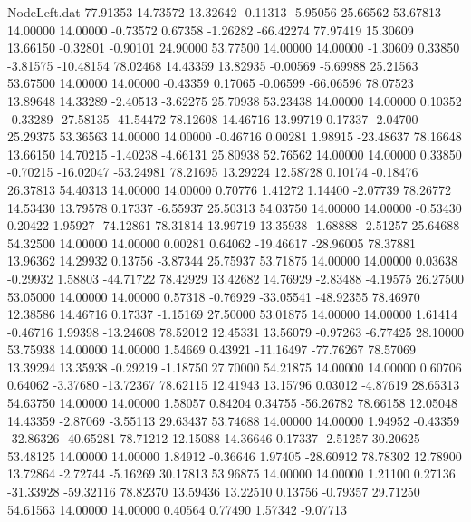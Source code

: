 \begin{filecontents}{NodeLeft.dat}
  77.91353   14.73572   13.32642    -0.11313   -5.95056   25.66562   53.67813   14.00000   14.00000   -0.73572    0.67358   -1.26282  -66.42274
  77.97419   15.30609   13.66150    -0.32801   -0.90101   24.90000   53.77500   14.00000   14.00000   -1.30609    0.33850   -3.81575  -10.48154
  78.02468   14.43359   13.82935    -0.00569   -5.69988   25.21563   53.67500   14.00000   14.00000   -0.43359    0.17065   -0.06599  -66.06596
  78.07523   13.89648   14.33289    -2.40513   -3.62275   25.70938   53.23438   14.00000   14.00000    0.10352   -0.33289  -27.58135  -41.54472
  78.12608   14.46716   13.99719     0.17337   -2.04700   25.29375   53.36563   14.00000   14.00000   -0.46716    0.00281    1.98915  -23.48637
  78.16648   13.66150   14.70215    -1.40238   -4.66131   25.80938   52.76562   14.00000   14.00000    0.33850   -0.70215  -16.02047  -53.24981
  78.21695   13.29224   12.58728     0.10174   -0.18476   26.37813   54.40313   14.00000   14.00000    0.70776    1.41272    1.14400   -2.07739
  78.26772   14.53430   13.79578     0.17337   -6.55937   25.50313   54.03750   14.00000   14.00000   -0.53430    0.20422    1.95927  -74.12861
  78.31814   13.99719   13.35938    -1.68888   -2.51257   25.64688   54.32500   14.00000   14.00000    0.00281    0.64062  -19.46617  -28.96005
  78.37881   13.96362   14.29932     0.13756   -3.87344   25.75937   53.71875   14.00000   14.00000    0.03638   -0.29932    1.58803  -44.71722
  78.42929   13.42682   14.76929    -2.83488   -4.19575   26.27500   53.05000   14.00000   14.00000    0.57318   -0.76929  -33.05541  -48.92355
  78.46970   12.38586   14.46716     0.17337   -1.15169   27.50000   53.01875   14.00000   14.00000    1.61414   -0.46716    1.99398  -13.24608
  78.52012   12.45331   13.56079    -0.97263   -6.77425   28.10000   53.75938   14.00000   14.00000    1.54669    0.43921  -11.16497  -77.76267
  78.57069   13.39294   13.35938    -0.29219   -1.18750   27.70000   54.21875   14.00000   14.00000    0.60706    0.64062   -3.37680  -13.72367
  78.62115   12.41943   13.15796     0.03012   -4.87619   28.65313   54.63750   14.00000   14.00000    1.58057    0.84204    0.34755  -56.26782
  78.66158   12.05048   14.43359    -2.87069   -3.55113   29.63437   53.74688   14.00000   14.00000    1.94952   -0.43359  -32.86326  -40.65281
  78.71212   12.15088   14.36646     0.17337   -2.51257   30.20625   53.48125   14.00000   14.00000    1.84912   -0.36646    1.97405  -28.60912
  78.78302   12.78900   13.72864    -2.72744   -5.16269   30.17813   53.96875   14.00000   14.00000    1.21100    0.27136  -31.33928  -59.32116
  78.82370   13.59436   13.22510     0.13756   -0.79357   29.71250   54.61563   14.00000   14.00000    0.40564    0.77490    1.57342   -9.07713

\end{filecontents}
